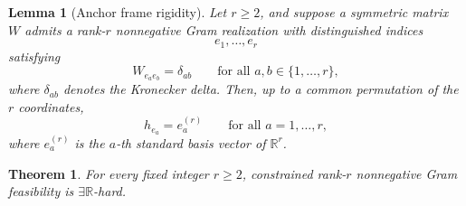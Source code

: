 \documentclass[10pt,a4paper]{amsart}
\newtheorem{lemma}{Lemma}
\newtheorem{theorem}{Theorem}
\begin{document}
\begin{lemma}[Anchor frame rigidity]
\label{lem:anchor-frame-rigidity}
Let \(r\ge 2\), and suppose a symmetric matrix \(W\) admits a rank-$r$
nonnegative Gram realization with distinguished indices
\[
e_1,\dots,e_r
\]
satisfying
\[
W_{e_a e_b}=\delta_{ab}
\qquad \text{for all } a,b\in\{1,\dots,r\},
\]
where \(\delta_{ab}\) denotes the Kronecker delta. Then, up to a common
permutation of the \(r\) coordinates,
\[
h_{e_a}=e_a^{(r)}
\qquad \text{for all } a=1,\dots,r,
\]
where \(e_a^{(r)}\) is the \(a\)-th standard basis vector of
\(\mathbb{R}^r\).
\end{lemma}

\begin{theorem}
\label{thm:hardness-fixed-r}
For every fixed integer \(r\ge 2\), constrained rank-$r$ nonnegative Gram
feasibility is \(\exists\mathbb{R}\)-hard.
\end{theorem}
\end{document}
